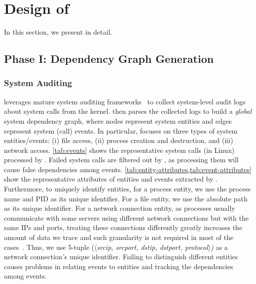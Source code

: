 \section{Design of \tool}
\label{sec:approach}

In this section, we present \tool in detail.




\subsection{Phase I: Dependency Graph Generation}
\label{subsec:phase1}

\subsubsection{System Auditing}
\label{subsubsec:system-auditing}

\tool leverages mature system auditing frameworks~\cite{auditd,etw,dtrace,sysdig} to collect
system-level audit logs about system calls from the kernel. 
\tool then parses the collected logs to build a \emph{global} system dependency graph, where nodes represent system entities and edges represent system (call) events. 
In particular, \tool focuses on three types of system entities/events: 
(i) file access, 
(ii) process creation and destruction, and
(iii) network access.
%
\cref{tab:events} shows the representative system calls (in Linux) processed by \tool.
Failed system calls are filtered out by \tool, as processing them will cause false dependencies among events.
\cref{tab:entity-attributes,tab:event-attributes} show the representative attributes of entities and events extracted by \tool.
%
Furthermore, to uniquely identify entities,
for a process entity, we use the process name and PID as its unique identifier.
For a file entity, we use the absolute path as its unique identifier. 
For a network 
connection entity, as processes usually communicate with some servers using different network connections but with the same IPs and ports, treating these connections differently greatly increases the amount of data we trace and such granularity is not required in most of the cases~\cite{liu2018priotracker,gao2018aiql,gao2018saql}. Thus, we use 5-tuple (\emph{$\langle$srcip, srcport, dstip, dstport, protocol$\rangle$)} as a network 
connection's
unique identifier. 
Failing to distinguish different entities causes problems in relating events to entities and tracking the dependencies among events.





